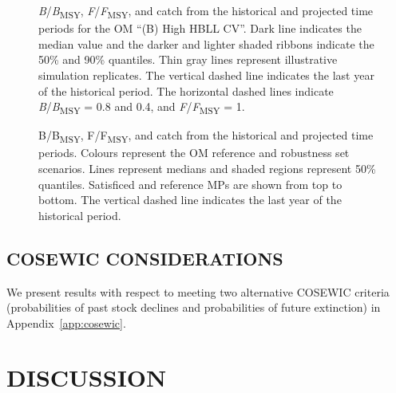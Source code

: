 \documentclass[11pt]{book}
\begin{document}
\begin{figure}[htb]

{\centering {} 

}

\caption{\emph{B}/\emph{B}\textsubscript{MSY}, \emph{F}/\emph{F}\textsubscript{MSY}, and catch from the historical and projected time periods for the OM ``(B) High HBLL CV''. Dark line indicates the median value and the darker and lighter shaded ribbons indicate the 50\% and 90\% quantiles. Thin gray lines represent illustrative simulation replicates. The vertical dashed line indicates the last year of the historical period. The horizontal dashed lines indicate \emph{B}/\emph{B}\textsubscript{MSY} = 0.8 and 0.4, and \emph{F}/\emph{F}\textsubscript{MSY} = 1.}\label{fig:proj-high-index-cv}
\end{figure}

\begin{figure}[htb]

{\centering {} 

}

\caption{B/B\textsubscript{MSY}, F/F\textsubscript{MSY}, and catch from the historical and projected time periods. Colours represent the OM reference and robustness set scenarios. Lines represent medians and shaded regions represent 50\% quantiles. Satisficed and reference MPs are shown from top to bottom. The vertical dashed line indicates the last year of the historical period.}\label{fig:proj-scenarios}
\end{figure}
\clearpage

\hypertarget{cosewic-considerations}{%
\subsection{COSEWIC CONSIDERATIONS}\label{cosewic-considerations}}

We present results with respect to meeting two alternative COSEWIC criteria (probabilities of past stock declines and probabilities of future extinction) in Appendix~\ref{app:cosewic}.

\hypertarget{sec:discussion}{%
\section{DISCUSSION}\label{sec:discussion}}
\end{document}
